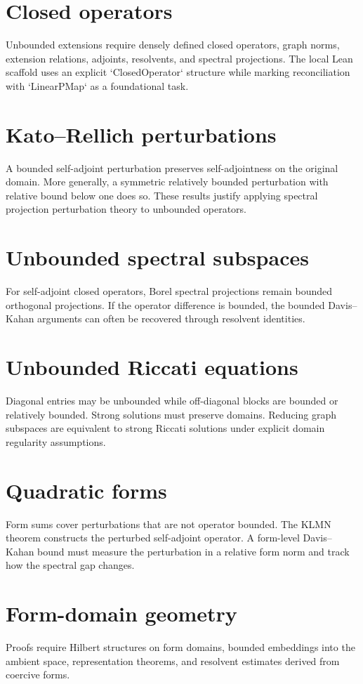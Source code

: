 \documentclass{article}
\begin{document}
\section{Closed operators}
Unbounded extensions require densely defined closed operators, graph norms,
extension relations, adjoints, resolvents, and spectral projections.  The
local Lean scaffold uses an explicit `ClosedOperator` structure while marking
reconciliation with `LinearPMap` as a foundational task.

\section{Kato--Rellich perturbations}
A bounded self-adjoint perturbation preserves self-adjointness on the original
domain.  More generally, a symmetric relatively bounded perturbation with
relative bound below one does so.  These results justify applying spectral
projection perturbation theory to unbounded operators.

\section{Unbounded spectral subspaces}
For self-adjoint closed operators, Borel spectral projections remain bounded
orthogonal projections.  If the operator difference is bounded, the bounded
Davis--Kahan arguments can often be recovered through resolvent identities.

\section{Unbounded Riccati equations}
Diagonal entries may be unbounded while off-diagonal blocks are bounded or
relatively bounded.  Strong solutions must preserve domains.  Reducing graph
subspaces are equivalent to strong Riccati solutions under explicit domain
regularity assumptions.

\section{Quadratic forms}
Form sums cover perturbations that are not operator bounded.  The KLMN theorem
constructs the perturbed self-adjoint operator.  A form-level Davis--Kahan
bound must measure the perturbation in a relative form norm and track how the
spectral gap changes.

\section{Form-domain geometry}
Proofs require Hilbert structures on form domains, bounded embeddings into the
ambient space, representation theorems, and resolvent estimates derived from
coercive forms.
\end{document}
